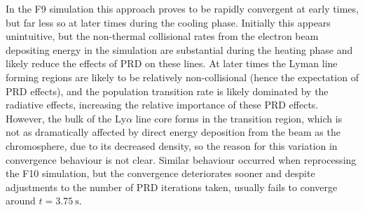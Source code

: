 In the F9 simulation this approach proves to be rapidly convergent at early times, but far less so at later times during the cooling phase.
Initially this appears unintuitive, but the non-thermal collisional rates from the electron beam depositing energy in the simulation are substantial during the heating phase and likely reduce the effects of PRD on these lines.
At later times the Lyman line forming regions are likely to be relatively non-collisional (hence the expectation of PRD effects), and the population transition rate is likely dominated by the radiative effects, increasing the relative importance of these PRD effects.
However, the bulk of the Ly$\alpha$ line core forms in the transition region, which is not as dramatically affected by direct energy deposition from the beam as the chromosphere, due to its decreased density, so the reason for this variation in convergence behaviour is not clear.
Similar behaviour occurred when reprocessing the F10 simulation, but the convergence deteriorates sooner and despite adjustments to the number of PRD iterations taken, usually fails to converge around $t=\SI{3.75}{\second}$.

